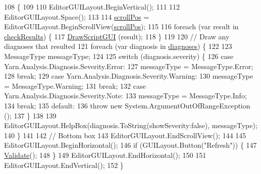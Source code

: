 \begin{DoxyCode}
108                      \{
109 
110             EditorGUILayout.BeginVertical();
111 
112             EditorGUILayout.Space();
113 
114             \hyperlink{a00085_a2d9b9702b0980af9d4202aebd440124b}{scrollPos} = EditorGUILayout.BeginScrollView(\hyperlink{a00085_a2d9b9702b0980af9d4202aebd440124b}{scrollPos});
115 
116             \textcolor{keywordflow}{foreach} (var result \textcolor{keywordflow}{in} \hyperlink{a00085_aa85ab7bd194e5425b991b9c216d4d10e}{checkResults}) \{
117                 \hyperlink{a00085_a1a7e1a855bb2a9549eb1c0eb292c9b85}{DrawScriptGUI} (result);
118             \}
119 
120             \textcolor{comment}{// Draw any diagnoses that resulted}
121             \textcolor{keywordflow}{foreach} (var diagnosis \textcolor{keywordflow}{in} \hyperlink{a00085_ab4784aaee761b7c60bb142cd410eb774}{diagnoses}) \{
122 
123                 MessageType messageType;
124 
125                 \textcolor{keywordflow}{switch} (diagnosis.severity) \{
126                 \textcolor{keywordflow}{case} Yarn.Analysis.Diagnosis.Severity.Error:
127                     messageType = MessageType.Error;
128                     \textcolor{keywordflow}{break};
129                 \textcolor{keywordflow}{case} Yarn.Analysis.Diagnosis.Severity.Warning:
130                     messageType = MessageType.Warning;
131                     \textcolor{keywordflow}{break};
132                 \textcolor{keywordflow}{case} Yarn.Analysis.Diagnosis.Severity.Note:
133                     messageType = MessageType.Info;
134                     \textcolor{keywordflow}{break};
135                 \textcolor{keywordflow}{default}:
136                     \textcolor{keywordflow}{throw} \textcolor{keyword}{new} System.ArgumentOutOfRangeException ();
137                 \}
138 
139                 EditorGUILayout.HelpBox(diagnosis.ToString(showSeverity:\textcolor{keyword}{false}), messageType);
140             \}
141 
142             \textcolor{comment}{// Bottom box}
143             EditorGUILayout.EndScrollView();
144 
145             EditorGUILayout.BeginHorizontal();
146             \textcolor{keywordflow}{if} (GUILayout.Button(\textcolor{stringliteral}{"Refresh"})) \{
147                 \hyperlink{a00085_ac4dbc30419c5647c1a2587b2ff7abd7c}{Validate}();
148             \}
149             EditorGUILayout.EndHorizontal();
150 
151             EditorGUILayout.EndVertical();
152         \}
\end{DoxyCode}
